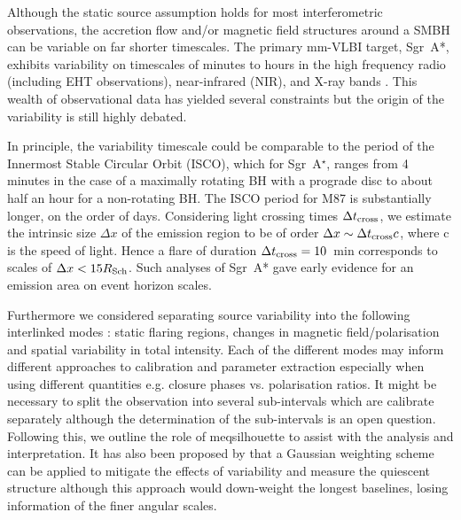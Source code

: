 Although the static source assumption holds for most interferometric observations, the accretion flow and/or magnetic field structures around a SMBH can be variable on far shorter timescales. The primary mm-VLBI target, Sgr~A*,  exhibits variability on timescales of minutes to hours in the high frequency radio (including EHT observations), near-infrared (NIR), and X-ray bands \citep[e.g.][]{Baganoff_2001, Genzel_2003, Yusef-Zadeh_2006,Marrone_2006, Fish_2011, Johnson_2015b}. This wealth of observational data has yielded several constraints but the origin of the variability is still highly debated.


In principle, the variability timescale could be comparable to the period of the Innermost Stable Circular Orbit (ISCO), which for Sgr~A$^\star$, ranges from 4 minutes in the case of a maximally rotating BH with a prograde disc to about half an hour for a non-rotating BH. The ISCO period for M87 is substantially longer, on the order of days. Considering light crossing times $\Delta t_{\rm cross}$, we estimate the intrinsic size $\Delta x$ of the emission region to be of order $\Delta x \sim \Delta t_{\rm cross} c$, where c is the speed of light. Hence a flare of duration $ \Delta t_{\rm cross} =10$~min corresponds to scales of  $\Delta x < 15 R_{\rm Sch}$. Such analyses of Sgr~A* gave early evidence for an emission area on event horizon scales.


Furthermore we considered separating source variability into the following interlinked modes : static flaring regions, changes in magnetic field/polarisation and spatial variability in total intensity. Each of the different modes may inform different approaches to calibration and parameter extraction especially when using different quantities e.g. closure phases vs. polarisation ratios. It might be necessary to split the observation into several sub-intervals which are calibrate separately although the determination of the sub-intervals is an open question. Following this, we outline the role of {\sc meqsilhouette} to assist with the analysis and interpretation. It has also been proposed by \citet{Lu_2016} that a Gaussian weighting scheme can be applied to mitigate the effects of variability and measure the quiescent structure although this approach would down-weight the longest baselines, losing information of the finer angular scales.



